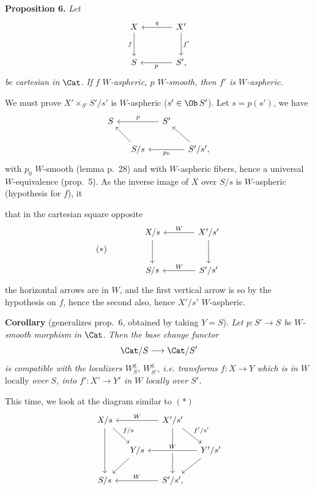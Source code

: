 \textbf{Proposition 6.} \textit{Let}
\[
\begin{tikzcd}[row sep=large, column sep=large]
X & X' \arrow[l, "q"'] \arrow[d, "f'"] \\
S \arrow[from=u, "f"'] & S', \arrow[l, "p"]
\end{tikzcd}
\]
\textit{be cartesian in} $\Cat$. \textit{If $f$} \textit{$W$-aspheric, $p$ $W$-smooth, then $f'$ is $W$-aspheric.}

We must prove $X'\times_{S'}S'/s'$ is $W$-aspheric ($s'\in\Ob\,S'$). Let $s=p(s')$, we have
\[
\begin{tikzcd}[column sep=small]
S & & S' \arrow[ll, "p"'] & \\
& S/s \arrow[ul] & & S'/s', \arrow[ul] \arrow[ll, "p_0"]
\end{tikzcd}
\]
with $p_0$ $W$-smooth (lemma p.~28) and with $W$-aspheric fibers, hence a universal $W$-equivalence (prop.~5). As the inverse image of $X$ over $S/s$ is $W$-aspheric (hypothesis for $f$), it 

\leavevmode{}that in the cartesian square opposite 
\[
(*)\qquad\qquad
\begin{tikzcd}[row sep=large, column sep=large]
X/s \arrow[d] & X'/s' \arrow[l, "W"'] \arrow[d] \\
S/s & S'/s' \arrow[l, "W"']
\end{tikzcd}
\]
the horizontal arrows are in $W$, and the first vertical arrow is so by the hypothesis on $f$, hence the second also, hence $X'/s'$ $W$-aspheric.

\textbf{Corollary} (generalizes prop.~6, obtained by taking $Y=S$). \textit{Let $p : S'\longrightarrow S$ be} \textit{$W$-smooth morphism in} $\Cat$. \textit{Then the base change functor}
\[
\Cat/S\longrightarrow\Cat/S'
\]
\textit{is compatible with the localizers $W^{\mathrm{g}}_S$, $W^{\mathrm{g}}_{S'}$, i.e. transforms $f : X\longrightarrow Y$ which is in $W$} locally \textit{over $S$, into $f' : X'\longrightarrow Y'$ in $W$ locally over $S'$.}

This time, we look at the diagram similar to $(*)$
\[
\begin{tikzcd}[column sep=small]
X/s \arrow[dd] \arrow[dr, "f/s"] & & X'/s' \arrow[ll, "W"'] \arrow[dd] \arrow[dr, "f'/s'"] & \\
& Y/s \arrow[dl] & & Y'/s' \arrow[ll, "W"', crossing over] \arrow[dl] \\
S/s & & S'/s', \arrow[ll, "W"'] &
\end{tikzcd}
\]

